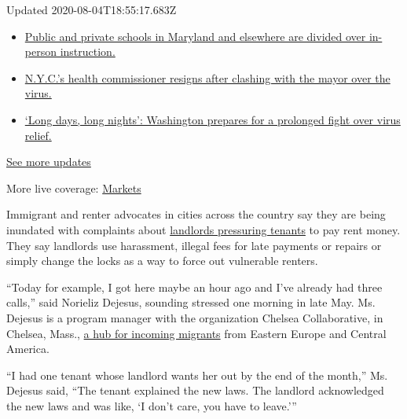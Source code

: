Updated 2020-08-04T18:55:17.683Z

\begin{itemize}
\tightlist
\item
  \href{https://www.nytimes.com/2020/08/04/world/coronavirus-cases.html?action=click\&pgtype=Article\&state=default\&region=MAIN_CONTENT_1\&context=storylines_live_updates\#link-4825b93}{Public
  and private schools in Maryland and elsewhere are divided over
  in-person instruction.}
\item
  \href{https://www.nytimes.com/2020/08/04/world/coronavirus-cases.html?action=click\&pgtype=Article\&state=default\&region=MAIN_CONTENT_1\&context=storylines_live_updates\#link-4d1eafa8}{N.Y.C.'s
  health commissioner resigns after clashing with the mayor over the
  virus.}
\item
  \href{https://www.nytimes.com/2020/08/04/world/coronavirus-cases.html?action=click\&pgtype=Article\&state=default\&region=MAIN_CONTENT_1\&context=storylines_live_updates\#link-6b644638}{`Long
  days, long nights': Washington prepares for a prolonged fight over
  virus relief.}
\end{itemize}

\href{https://www.nytimes.com/2020/08/04/world/coronavirus-cases.html?action=click\&pgtype=Article\&state=default\&region=MAIN_CONTENT_1\&context=storylines_live_updates}{See
more updates}

More live coverage:
\href{https://www.nytimes.com/live/2020/08/04/business/stock-market-today-coronavirus?action=click\&pgtype=Article\&state=default\&region=MAIN_CONTENT_1\&context=storylines_live_updates}{Markets}

Immigrant and renter advocates in cities across the country say they are
being inundated with complaints about
\href{https://www.nytimes.com/2020/07/23/business/evictions-moratorium-cares-act.html}{landlords
pressuring tenants} to pay rent money. They say landlords use
harassment, illegal fees for late payments or repairs or simply change
the locks as a way to force out vulnerable renters.

``Today for example, I got here maybe an hour ago and I've already had
three calls,'' said Norieliz Dejesus, sounding stressed one morning in
late May. Ms. Dejesus is a program manager with the organization Chelsea
Collaborative, in Chelsea, Mass.,
\href{https://www.nytimes.com/2020/04/25/us/coronavirus-chelsea-massachusetts.html}{a
hub for incoming migrants} from Eastern Europe and Central America.

``I had one tenant whose landlord wants her out by the end of the
month,'' Ms. Dejesus said, ``The tenant explained the new laws. The
landlord acknowledged the new laws and was like, `I don't care, you have
to leave.'''

